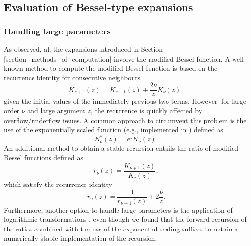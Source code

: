 \documentclass[10pt,a4paper,oneside]{article}
\numberwithin{equation}{section}
\begin{document}
\subsection{Evaluation of Bessel-type expansions}
\label{subsection_evaluation_bessel_expansions}

\subsubsection{Handling large parameters}
As observed, all the expansions introduced in Section \ref{section_methods_of_computation} involve the modified Bessel function. A well-known method to compute the modified Bessel function is based on the recurrence identity for consecutive neighbours \cite{Abramowitz1972}
\begin{equation}
K_{\nu + 1}(z) = K_{\nu - 1}(z) + \frac{2\nu}{z} K_{\nu}(z),
\end{equation}
given the initial values of the immediately previous two terms. However, for large order $\nu$ and large argument $z$, the recurrence is quickly affected by overflow/underflow issues. A common approach to circumvent this problem is the use of the exponentially scaled function (e.g., implemented in \cite{Cody1993}) defined as
\begin{equation}
K^*_{\nu}(z) = e^z K_{\nu}(z).
\end{equation}
An additional method to obtain a stable recursion entails the ratio of modified Bessel functions defined as
\begin{equation}
r_{\nu}(z) = \frac{K_{\nu+1}(z)}{K_{\nu}(z)},
\end{equation} 
which satisfy the recurrence identity \cite{Xue2018}
\begin{equation}
r_{\nu}(z) = \frac{1}{r_{\nu - 1}(z)} + 2\frac{\nu}{z}.
\end{equation}
Furthermore, another option to handle large parameters is the application of logarithmic transformations \cite{Xue2018}, even though we found that the forward recursion of the ratios combined with the use of the exponential scaling suffices to obtain a numerically stable implementation of the recursion.
\end{document}
